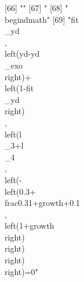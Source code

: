  [66] ""                                                                                                                                                                                                                                                                                                                                                                                                                                                                                            
 [67] "%
 [68] "\\begin{dmath}"                                                                                                                                                                                                                                                                                                                                                                                                                                                                              
 [69] "{{fit\\_yd}}\\, \\left({yd}-{{yd\\_exo}}\\right)+\\left(1-{{fit\\_yd}}\\right)\\, \\left({{l\\_3}}+{{l\\_4}}\\, \\left(-\\left(0.3+\\frac{0.3}{1+{growth}}+0.1\\, \\left(1+{growth}\\right)\\right)\\right)\\right)=0"                                                                                                                                                                                                                                                                       
